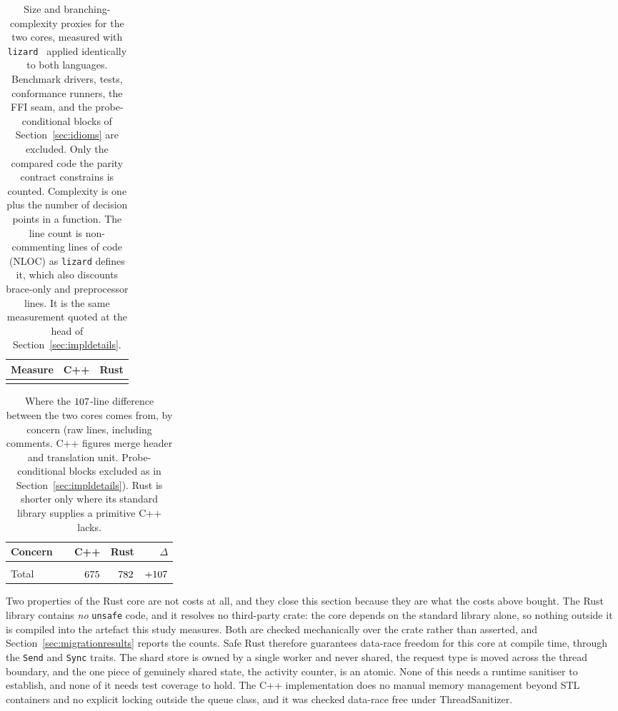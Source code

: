 \documentclass[english,oneside,a4paper,censored,csm,software-track-2020]{HYthesisML}
\begin{document}
\begin{table}[H]
\centering
\small
\caption[Size and branching-complexity proxies for the two cores]{Size and branching-complexity proxies for the two cores, measured with
\texttt{lizard}~\cite{lizard} applied identically to both languages. Benchmark drivers, tests,
conformance runners, the FFI seam, and the probe-conditional blocks of
Section~\ref{sec:idioms} are excluded. Only the compared code the parity contract constrains is
counted. Complexity is one plus the number of decision points in a function. The line count is
non-commenting lines of code (NLOC) as \texttt{lizard} defines it, which also discounts
brace-only and preprocessor lines. It
is the same measurement quoted at the head of
Section~\ref{sec:impldetails}.\label{tab:complexity}}
\begin{tabular}{@{}l r r@{}}
\hline\hline
Measure & C++ & Rust \\
\hline
\\
\hline
\end{tabular}
\end{table}

\begin{table}[H]
\centering
\small
\caption[Where the line-count difference between the cores comes from]{Where the $\LocGap$-line difference between the two cores comes from, by concern (raw
lines, including comments. C++ figures merge header and translation unit. Probe-conditional
blocks excluded as in Section~\ref{sec:impldetails}). Rust is shorter
only where its standard library supplies a primitive C++ lacks.\label{tab:loc}}
\begin{tabular}{@{}R{0.38\linewidth} r r r@{}}
\hline\hline
Concern & C++ & Rust & $\Delta$ \\
\hline
\\
\hline
Total                             & $675$ & $782$ & $+107$ \\
\hline
\end{tabular}
\end{table}

Two properties of the Rust core are not costs at all, and they close this section because they are
what the costs above bought. The Rust library contains \emph{no} \texttt{unsafe} code, and it
resolves no third-party crate: the core depends on the standard library alone, so nothing outside it
is compiled into the artefact this study measures. Both are checked mechanically over the crate
rather than asserted, and Section~\ref{sec:migrationresults} reports the counts.
Safe Rust therefore guarantees data-race freedom for this core at
compile time, through the \texttt{Send} and \texttt{Sync} traits. The shard store is owned by a
single worker and never shared, the request type is moved across the thread boundary, and the
one piece of genuinely shared state, the activity counter, is an atomic. None of this needs a
runtime sanitiser to establish, and none of it needs test coverage to hold. The C++
implementation does no manual memory management beyond STL containers and no explicit
locking outside the queue class, and it was checked data-race free under ThreadSanitizer.
\end{document}
